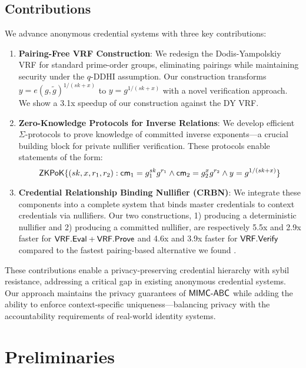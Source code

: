 \subsection{Contributions}

We advance anonymous credential systems with three key contributions:

\begin{enumerate}
    \item \textbf{Pairing-Free VRF Construction}: We redesign the Dodis-Yampolskiy VRF for standard prime-order groups, eliminating pairings while maintaining security under the $q$-DDHI assumption. Our construction transforms $y = e(g, \tilde{g})^{1/(sk+x)}$ to $y = g^{1/(sk+x)}$ with a novel verification approach. We show a 3.1x speedup of our construction against the DY VRF. 
    
    \item \textbf{Zero-Knowledge Protocols for Inverse Relations}: We develop efficient $\Sigma$-protocols to prove knowledge of committed inverse exponents—a crucial building block for private nullifier verification. These protocols enable statements of the form:
    \[
    {\mathsf{ZKPoK}}\{(sk, x, r_1, r_2) : \mathsf{cm}_1 = g_1^{sk}g^{r_1} \land \mathsf{cm}_2 = g_2^{x}g^{r_2} \land y = g^{1/(sk+x)}\}
    \]
    
    \item \textbf{Credential Relationship Binding Nullifier (CRBN)}: We integrate these components into a complete system that binds master credentials to context credentials via nullifiers. Our two constructions, 1) producing a deterministic nullifier and 2) producing a committed nullifier, are respectively 5.5x and 2.9x faster for  $\mathsf{VRF.Eval}+\mathsf{VRF.Prove}$ and 4.6x and 3.9x faster for $\mathsf{VRF.Verify}$ compared to the fastest pairing-based alternative we found \cite{tomescu2022utt}.
\end{enumerate}

These contributions enable a privacy-preserving credential hierarchy with sybil resistance, addressing a critical gap in existing anonymous credential systems. Our approach maintains the privacy guarantees of $\mathsf{MIMC\text{-}ABC}$ while adding the ability to enforce context-specific uniqueness—balancing privacy with the accountability requirements of real-world identity systems.






\section{Preliminaries}

